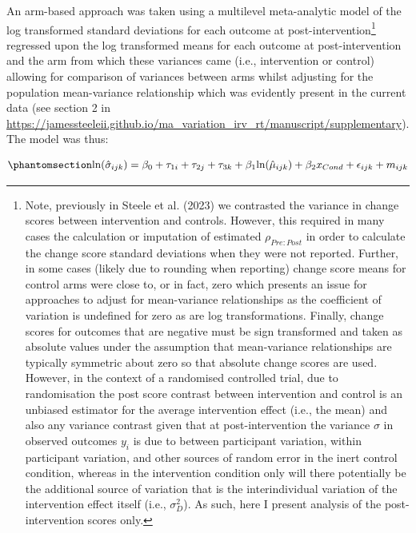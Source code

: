 \documentclass[
]{article}
\begin{document}
An arm-based approach was taken using a multilevel meta-analytic model
of the log transformed standard deviations for each outcome at
post-intervention\footnote{Note, previously in Steele et al. (2023) we
  contrasted the variance in change scores between intervention and
  controls. However, this required in many cases the calculation or
  imputation of estimated \(\rho_{Pre:Post}\) in order to calculate the
  change score standard deviations when they were not reported. Further,
  in some cases (likely due to rounding when reporting) change score
  means for control arms were close to, or in fact, zero which presents
  an issue for approaches to adjust for mean-variance relationships as
  the coefficient of variation is undefined for zero as are log
  transformations. Finally, change scores for outcomes that are negative
  must be sign transformed and taken as absolute values under the
  assumption that mean-variance relationships are typically symmetric
  about zero so that absolute change scores are used. However, in the
  context of a randomised controlled trial, due to randomisation the
  post score contrast between intervention and control is an unbiased
  estimator for the average intervention effect (i.e., the mean) and
  also any variance contrast given that at post-intervention the
  variance \(\sigma\) in observed outcomes \(y_i\) is due to between
  participant variation, within participant variation, and other sources
  of random error in the inert control condition, whereas in the
  intervention condition only will there potentially be the additional
  source of variation that is the interindividual variation of the
  intervention effect itself (i.e., \(\sigma_{D}^2\)). As such, here I
  present analysis of the post-intervention scores only.} regressed upon
the log transformed means for each outcome at post-intervention and the
arm from which these variances came (i.e., intervention or control)
allowing for comparison of variances between arms whilst adjusting for
the population mean-variance relationship which was evidently present in
the current data (see section 2 in
\url{https://jamessteeleii.github.io/ma_variation_irv_rt/manuscript/supplementary}).
The model was thus:

\begin{equation}\protect\phantomsection\label{eq-mean-var-meta}{
\begin{aligned}
\text{ln}(\hat{\sigma}_{ijk})=\beta_{0}+\tau_{1i}+\tau_{2j}+\tau_{3k}+\beta_{1}\text{ln}(\hat{\mu}_{ijk})+\beta_{2} x_{Cond}+\epsilon_{ijk}+m_{ijk}
\end{aligned}
}\end{equation}
\end{document}
